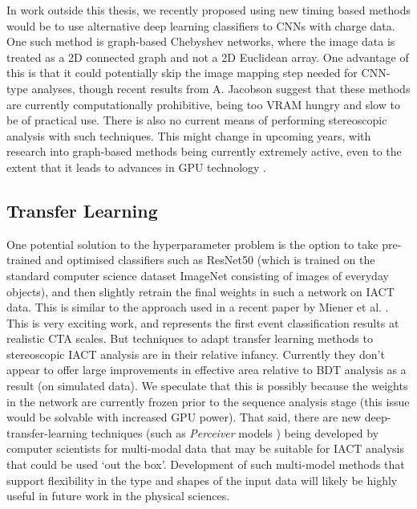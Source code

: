 In work outside this thesis, we recently proposed using new timing based methods would be to use alternative deep learning classifiers to CNNs with charge data. One such method is graph-based Chebyshev networks, where the image data is treated as a 2D connected graph and not a 2D Euclidean array. One advantage of this is that it could potentially skip the image mapping step needed for CNN-type analyses, though recent results from A. Jacobson \cite{adithesis} suggest that these methods are currently computationally prohibitive, being too VRAM hungry and slow to be of practical use. There is also no current means of performing stereoscopic analysis with such techniques. This might change in upcoming years, with research into graph-based methods being currently extremely active, even to the extent that it leads to advances in GPU technology  \cite{graphcore}.

\subsection{Transfer Learning}
One potential solution to the hyperparameter problem is the option to take pre-trained and optimised classifiers such as ResNet50 \cite{resnet50} (which is trained on the standard computer science dataset ImageNet \cite{ImageNet} consisting of images of everyday objects), and then slightly retrain the final weights in such a network on IACT data. This is similar to the approach used in a recent paper by Miener et al. \cite{tjarkicrc}. This is very exciting work, and represents the first event classification results at realistic CTA scales. But techniques to adapt transfer learning methods to stereoscopic IACT analysis are in their relative infancy. Currently they don't appear to offer large improvements in effective area relative to BDT analysis as a result (on simulated data). We speculate that this is possibly because the weights in the network are currently frozen prior to the sequence analysis stage (this issue would be solvable with increased GPU power). That said, there are new deep-transfer-learning techniques (such as \textit{Perceiver} models \cite{perceiver}) being developed by computer scientists for multi-modal data that may be suitable for IACT analysis that could be used `out the box'. Development of such multi-model methods that support flexibility in the type and shapes of the input data will likely be highly useful in future work in the physical sciences.

